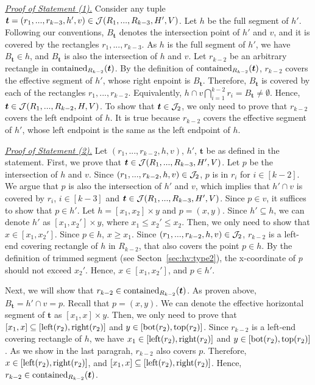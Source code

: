 \noindent \underline{\em Proof of Statement (1).} Consider any tuple $\textrm{\boldmath${t}$} = (r_1,...,r_{k-3}, h', v) \in \mathcal{J}(R_1,...,R_{k-3},H',V)$. Let $h$ be the full segment of $h'$. Following our conventions, $B_\bm{t}$ denotes the intersection point of $h'$ and $v$, and it is covered by the rectangles $r_1,...,r_{k-3}$. As $h$ is the full segment of $h'$, we have $B_\bm{t} \in h$, and $B_\bm{t}$ is also the intersection of $h$ and $v$. Let $r_{k-2}$ be an arbitrary rectangle in $\mathrm{contained}_{R_{k-2}}(\textrm{\boldmath${t}$})$. By the definition of $\mathrm{contained}_{R_{k-2}}(\textrm{\boldmath${t}$})$, $r_{k-2}$ covers the effective segment of $h'$, whose right enpoint is $B_{\bm{t}}$. Therefore, $B_{\bm{t}}$ is covered by each of the rectangles $r_1,...,r_{k-2}$. Equivalently, $h \cap v \bigcap_{i = 1}^{k-2} r_i = B_\bm{t} \neq \emptyset$. Hence,
$\textrm{\boldmath${t}$} \in \mathcal{J}(R_1,...,R_{k-2},H,V)$. To show that $\textrm{\boldmath${t}$} \in \mathcal{J}_2$, we only need to prove that $r_{k-2}$ covers the left endpoint of $h$. It is true because $r_{k-2}$ covers the effective segment of $h'$, whose left endpoint is the same as the left endpoint of $h$. 

\vgap 

\noindent \underline{\em Proof of Statement (2).} Let $(r_1,...,r_{k-2},h,v)$, $h'$, $\bm{t}$ be as defined in the statement. First, we prove that $\textrm{\boldmath${t}$}\in \mathcal{J}(R_1,...,R_{k-3}, H', V)$.
Let $p$ be the intersection of $h$ and $v$. Since $(r_1,...,r_{k-2},h,v)\in \mathcal{J}_2$, $p$ is in $r_i$ for $i \in [k-2]$.
We argue that $p$ is also the intersection of $h'$ and $v$, which implies that $h'\cap v$ is covered by $r_i$, $i \in [k-3]$ and $\textrm{\boldmath${t}$} \in \mathcal{J}(R_1,...,R_{k-3},H',V)$. Since $p \in v$, it suffices to show that $p \in h'$. Let $h = [x_1,x_2]\times y$ and $p = (x,y)$. Since $h' \subseteq h$, we can denote $h'$ as $[x_1, x_2'] \times y$, where $x_1 \le x_2' \le x_2$. Then, we only need to show that $x \in [x_1, x_2']$. Since $p \in h$, $x \ge x_1$. Since $(r_1,...,r_{k-2},h,v) \in \mathcal{J}_2$, $r_{k-2}$ is a left-end covering rectangle of $h$ in $R_{k-2}$, that also covers the point $p \in h$. By the definition of trimmed segment (see Secton~\ref{sec:hv:type2}), the x-coordinate of $p$ should not exceed $x_2'$. Hence, $x \in [x_1, x_2']$, and $p \in h'$.

\vgap 

Next, we will show that $r_{k-2}\in \mathrm{contained}_{R_{k-2}}(\textrm{\boldmath${t}$})$. As proven above, $B_\bm{t} = h'\cap v = p$. Recall that $p = (x,y)$. We can denote the effective horizontal segment of $\bm{t}$ as $[x_1, x] \times y$. Then, we only need to prove that $[x_1,x] \subseteq [\mathrm{left}(r_2), \mathrm{right}(r_2)]$ and $y \in [\mathrm{bot}(r_2), \mathrm{top}(r_2)]$. Since $r_{k-2}$ is a left-end covering rectangle of $h$, we have  $x_1 \in [\mathrm{left}(r_2), \mathrm{right}(r_2)]$ and $y \in [\mathrm{bot}(r_2), \mathrm{top}(r_2)]$. As we show in the last paragrah, $r_{k-2}$ also covers $p$. Therefore, $x \in [\mathrm{left}(r_2), \mathrm{right}(r_2)]$, and $[x_1,x] \subseteq [\mathrm{left}(r_2), \mathrm{right}(r_2)]$. Hence, $r_{k-2}\in \mathrm{contained}_{R_{k-2}}(\textrm{\boldmath${t}$})$.

